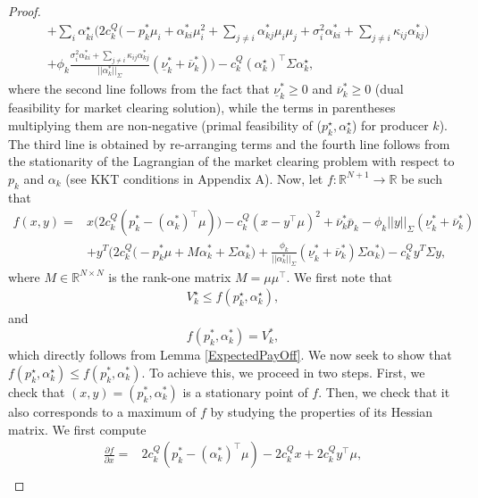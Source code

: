 \documentclass{article}
\begin{document}
\begin{proof}
\begin{align*}
   &+ \sum_i \alpha_{ki}^\star \Big(2c_k^Q\big(- p_k^* \mu_i + \alpha_{ki}^*\mu_i^2 + \sum_{j \ne i} \alpha_{kj}^* \mu_i \mu_j + \sigma_i^2 \alpha_{ki}^* + \sum_{j \ne i} \kappa_{ij} \alpha_{kj}^*\big) \\
    &+ \phi_k \frac{\sigma_i^2 \alpha_{ki}^* + \sum_{j \ne i} \kappa_{ij} \alpha_{kj}^*}{||\alpha_k^*||_\Sigma}(\underline{\nu}_k^* +\overline{\nu}_k^*)\Big) - c_k^Q (\alpha_k^\star)^\top\Sigma \alpha_k^\star,
\end{align*}
where the second line follows from the fact that $\underline{\nu}_k^* \ge 0$ and $\overline{\nu}_k^* \ge 0$ (dual feasibility for market clearing solution), while the terms in parentheses multiplying them are non-negative (primal feasibility of ($p_k^\star, \alpha_k^\star$) for producer $k$). The third line is obtained by re-arranging terms and the fourth line follows from the stationarity of the Lagrangian of the market clearing problem with respect to $p_k$ and $\alpha_k$ (see KKT conditions in Appendix A). Now, let $f:\mathbb{R}^{N+1} \rightarrow \mathbb{R}$ be such that
\begin{align*}
f(x, y) =& x \big(2c_k^Q(p_k^* - (\alpha_k^*)^\top \mu)\big) - c_k^Q(x - y^\top \mu)^2 + \overline{\nu}_k^* \overline{p}_k - \phi_k ||y||_\Sigma (\underline{\nu}_k^* + \overline{\nu}_k^*)\\ 
    &+ y^T \Big(2c_k^Q\big(- p_k^* \mu + M \alpha_k^* + \Sigma \alpha_k^*\big) + \frac{\phi_k}{||\alpha_k^*||_\Sigma}(\underline{\nu}_k^* +\overline{\nu}_k^*) \Sigma \alpha_k^*\Big) - c_k^Q y^T \Sigma y,
\end{align*}
where $M \in \mathbb{R}^{N \times N}$ is the rank-one matrix $M = \mu \mu^\top$.
We first note that
\begin{align*}
V_k^\star \le f(p_k^\star, \alpha_k^\star),
\end{align*} 
and
\begin{equation*}
f(p_k^*, \alpha_k^*) = V_k^*,
\end{equation*}
which directly follows from Lemma \ref{ExpectedPayOff}. We now seek to show that $f(p_k^\star, \alpha_k^\star) \le f(p_k^*, \alpha_k^*)$. To achieve this, we proceed in two steps. First, we check that $(x, y) = (p_k^*, \alpha_k^*)$ is a stationary point of $f$. Then, we check that it also corresponds to a maximum of $f$ by studying the properties of its Hessian matrix. We first compute
\begin{align*}
\frac{\partial f}{\partial x} =& 2c_k^Q(p_k^* - (\alpha_k^*)^\top\mu) - 2 c_k^Q x + 2c_k^Q y^\top \mu,\\

\end{align*}
\end{proof}
\end{document}
